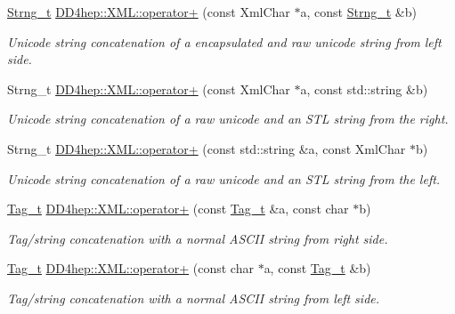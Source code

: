 \begin{DoxyCompactItemize}
\hyperlink{class_d_d4hep_1_1_x_m_l_1_1_strng__t}{Strng\_\-t} \hyperlink{group___d_d4_h_e_p___x_m_l_gafe9f9443003bbab38d67856960e62071}{DD4hep::XML::operator+} (const XmlChar $\ast$a, const \hyperlink{class_d_d4hep_1_1_x_m_l_1_1_strng__t}{Strng\_\-t} \&b)
\begin{DoxyCompactList}\small\item\em Unicode string concatenation of a encapsulated and raw unicode string from left side. \item\end{DoxyCompactList}\item 
Strng\_\-t \hyperlink{group___d_d4_h_e_p___x_m_l_ga818876f0e3a3be20c11eeb6ea2871bdc}{DD4hep::XML::operator+} (const XmlChar $\ast$a, const std::string \&b)
\begin{DoxyCompactList}\small\item\em Unicode string concatenation of a raw unicode and an STL string from the right. \item\end{DoxyCompactList}\item 
Strng\_\-t \hyperlink{group___d_d4_h_e_p___x_m_l_ga2158e654f7603cf773042a5cb231f398}{DD4hep::XML::operator+} (const std::string \&a, const XmlChar $\ast$b)
\begin{DoxyCompactList}\small\item\em Unicode string concatenation of a raw unicode and an STL string from the left. \item\end{DoxyCompactList}\item 
\hyperlink{class_d_d4hep_1_1_x_m_l_1_1_tag__t}{Tag\_\-t} \hyperlink{group___d_d4_h_e_p___x_m_l_gacf5fdc46e1dad4d2935283ead3a4c0fd}{DD4hep::XML::operator+} (const \hyperlink{class_d_d4hep_1_1_x_m_l_1_1_tag__t}{Tag\_\-t} \&a, const char $\ast$b)
\begin{DoxyCompactList}\small\item\em Tag/string concatenation with a normal ASCII string from right side. \item\end{DoxyCompactList}\item 
\hyperlink{class_d_d4hep_1_1_x_m_l_1_1_tag__t}{Tag\_\-t} \hyperlink{group___d_d4_h_e_p___x_m_l_ga16ba3dffdb36f1a0ae319fde7dcdb5ca}{DD4hep::XML::operator+} (const char $\ast$a, const \hyperlink{class_d_d4hep_1_1_x_m_l_1_1_tag__t}{Tag\_\-t} \&b)
\begin{DoxyCompactList}\small\item\em Tag/string concatenation with a normal ASCII string from left side. \item\end{DoxyCompactList}\item 

\end{DoxyCompactItemize}
